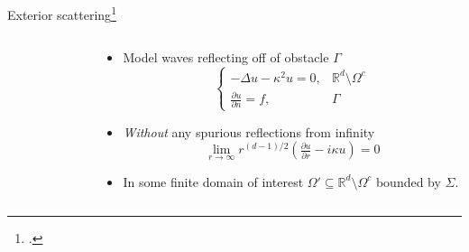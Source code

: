 \documentclass{beamer}
\begin{document}
\begin{frame}{Exterior scattering\footcite{Colton_Kress_1998,Kress_1999}}
    \begin{columns}
    \begin{column}{0.45\textwidth}
        \begin{figure}[ht]
        \begin{center}
        \end{center}\label{fig:2ddomain}
        \end{figure}
    \end{column}
    \begin{column}{0.55\textwidth}
        \begin{itemize}
            \item<1-> Model waves reflecting off of obstacle $\Gamma$
            \[
                \begin{cases}
                    -\Delta u - \kappa^2 u = 0, &  \mathbb R^d\setminus\Omega^c \\
                    \frac{\partial u}{\partial n} = f, & \Gamma
                \end{cases}
            \]
            \item<2-> \emph{Without} any spurious reflections from infinity
            \[
                \lim_{r\to\infty} r^{(d-1)/2}
                    \left(\tfrac{\partial u}{\partial r} - i\kappa u\right)
                = 0
            \]
            \item<3-> In some finite domain of interest 
            $\Omega'\subseteq \mathbb R^d\setminus\Omega^c$
            bounded by $\Sigma$.
        \end{itemize}
    \end{column}
\end{columns}
\end{frame}
\end{document}
